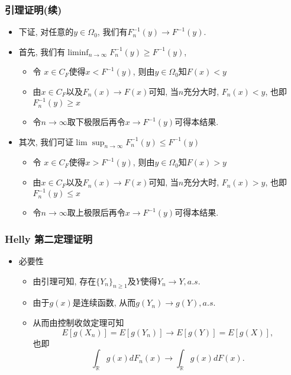 \begin{frame}
	\frametitle{引理证明(续)}
	\begin{itemize}[<+-|alert@+>]

		 \item 下证, 对任意的$y \in \Omega_{0}$, 我们有$F_{n}^{-1}(y) \rightarrow F^{-1}(y)$.
		 \item 首先, 我们有${\liminf _{n \rightarrow \infty} F_{n}^{-1}(y) \geq F^{-1}(y)}$,
		 \begin{itemize}[<+-|alert@+>]
		 \item 令 $x\in C_F$使得$x<F^{-1}(y)$, 则由$y\in \Omega_0$知$F(x)<y$
		 \item 由$x\in C_F$以及$F_n(x)\rightarrow F(x)$可知, 当$n$充分大时, $F_n(x)<y$, 也即 $F_n^{-1}(y)\geq x$
		 \item 令$n\rightarrow\infty$取下极限后再令$x\rightarrow F^{-1}(y)$可得本结果.
		 \end{itemize}
		 \item 其次, 我们可证${\lim \sup _{n \rightarrow \infty} F_{n}^{-1}(y) \leq F^{-1}(y)}$
		 \begin{itemize}[<+-|alert@+>]
			\item 令 $x\in C_F$使得$x>F^{-1}(y)$, 则由$y\in \Omega_0$知$F(x)>y$
			\item 由$x\in C_F$以及$F_n(x)\rightarrow F(x)$可知, 当$n$充分大时, $F_n(x)>y$, 也即 $F_n^{-1}(y)\leq x$
			\item 令$n\rightarrow\infty$取上极限后再令$x\rightarrow F^{-1}(y)$可得本结果.
		 \end{itemize}


		\end{itemize}
\end{frame}


\begin{frame}
	\frametitle{{\rm Helly} 第二定理证明}
	\begin{itemize}[<+-|alert@+>]
	\item 必要性
	\begin{itemize}[<+-|alert@+>]
		\item 由引理可知, 存在$\{Y_n\}_{n\geq 1}$及$Y$使得$Y_n\rightarrow Y,    a.s.$
		\item 由于$g(x)$是连续函数, 从而$g(Y_n)\rightarrow g(Y), a.s.$
		\item 从而由控制收敛定理可知
		\[E[g(X_n)]=E[g(Y_n)]\rightarrow E[g(Y)]=E[g(X)], \]
		\pause 也即
	   \[\int_{\mathbb{R}}g(x)dF_n(x)\rightarrow\int_{\mathbb{R}}g(x)dF(x).\]
	\end{itemize}

	\end{itemize}



\end{frame}


